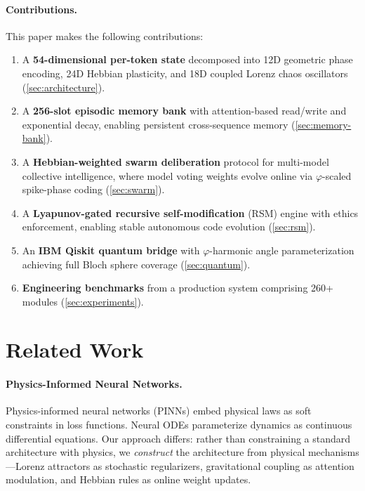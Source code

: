 \documentclass[11pt,a4paper]{article}
\begin{document}
\paragraph{Contributions.} This paper makes the following contributions:
\begin{enumerate}[leftmargin=*,itemsep=2pt]
    \item A \textbf{54-dimensional per-token state} decomposed into 12D geometric phase encoding, 24D Hebbian plasticity, and 18D coupled Lorenz chaos oscillators (\cref{sec:architecture}).
    \item A \textbf{256-slot episodic memory bank} with attention-based read/write and exponential decay, enabling persistent cross-sequence memory (\cref{sec:memory-bank}).
    \item A \textbf{Hebbian-weighted swarm deliberation} protocol for multi-model collective intelligence, where model voting weights evolve online via $\varphi$-scaled spike-phase coding (\cref{sec:swarm}).
    \item A \textbf{Lyapunov-gated recursive self-modification} (RSM) engine with ethics enforcement, enabling stable autonomous code evolution (\cref{sec:rsm}).
    \item An \textbf{IBM Qiskit quantum bridge} with $\varphi$-harmonic angle parameterization achieving full Bloch sphere coverage (\cref{sec:quantum}).
    \item \textbf{Engineering benchmarks} from a production system comprising 260+ modules (\cref{sec:experiments}).
\end{enumerate}

\section{Related Work}
\label{sec:related}

\paragraph{Physics-Informed Neural Networks.}
Physics-informed neural networks (PINNs) \citep{raissi2019physics} embed physical laws as soft constraints in loss functions. Neural ODEs \citep{chen2018neural} parameterize dynamics as continuous differential equations. Our approach differs: rather than constraining a standard architecture with physics, we \emph{construct} the architecture from physical mechanisms---Lorenz attractors as stochastic regularizers, gravitational coupling as attention modulation, and Hebbian rules as online weight updates.
\end{document}

